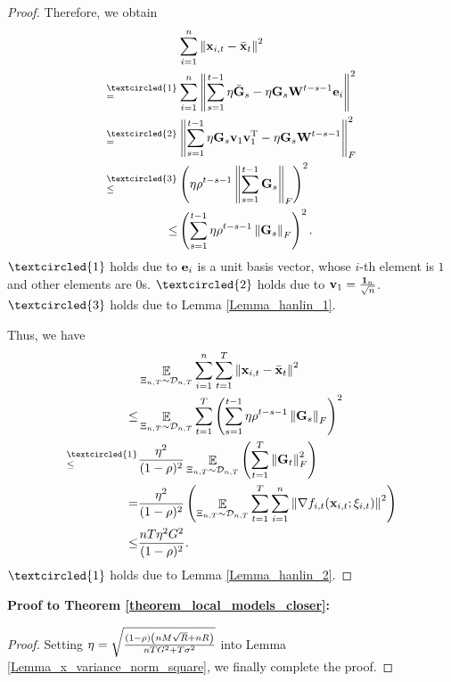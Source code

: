 \documentclass{article}
\begin{document}
\begin{proof}
Therefore, we obtain
\begin{align}
\nonumber
& \sum_{i=1}^n \lrnorm{\x_{i,t} - \bar{\x}_t}^2 \\ \nonumber
\refabovecir{=}{\textcircled{1}} & \sum_{i=1}^n \lrnorm{ \sum_{s=1}^{t-1} \eta \bar{\G}_s - \eta \G_s \W^{t-s-1}\e_i }^2   \\ \nonumber
\refabovecir{=}{\textcircled{2}} & \lrnorm{ \sum_{s=1}^{t-1} \eta \G_s\v_1 \v_1\Tr - \eta \G_s \W^{t-s-1} }^2_F   \\ \nonumber
\refabovecir{\le}{\textcircled{3}} & \lrincir{ \eta \rho^{t-s-1} \lrnorm{\sum_{s=1}^{t-1}\G_s}_F}^2 \\ \nonumber
\le & \lrincir{ \sum_{s=1}^{t-1} \eta \rho^{t-s-1} \lrnorm{\G_s}_F}^2.
\end{align} $\textcircled{1}$ holds due to ${\bf e}_i$ is a unit basis vector, whose $i$-th element is $1$ and other elements are $0$s. $\textcircled{2}$ holds due to ${\bf v}_1 = \frac{{\bf 1}_n}{\sqrt{n}}$. $\textcircled{3}$ holds due to Lemma \ref{Lemma_hanlin_1}. 


Thus, we  have
\begin{align}
\nonumber
& \EE_{ \Xi_{n,T} \sim \Dcal_{n,T} } \sum_{i=1}^n\sum_{t=1}^T \lrnorm{\x_{i,t} - \bar{\x}_t}^2  \\ \nonumber 
\le & \EE_{ \Xi_{n,T} \sim \Dcal_{n,T} } \sum_{t=1}^T \lrincir{ \sum_{s=1}^{t-1} \eta \rho^{t-s-1} \lrnorm{\G_s}_F}^2  \\ \nonumber
\refabovecir{\le}{\textcircled{1}} & \frac{\eta^2}{(1-\rho)^2} \EE_{ \Xi_{n,T} \sim \Dcal_{n,T} } \lrincir{  \sum_{t=1}^T \lrnorm{\G_t}_F^2 } \\ \nonumber
= & \frac{\eta^2}{(1-\rho)^2} \lrincir{ \EE_{ \Xi_{n,T} \sim \Dcal_{n,T} } \sum_{t=1}^T \sum_{i=1}^n  \lrnorm{\nabla f_{i,t}(\x_{i,t};\xi_{i,t})}^2 } \\ \nonumber
\le & \frac{nT\eta^2 G^2 }{(1-\rho)^2}.
\end{align} $\textcircled{1}$ holds due to Lemma \ref{Lemma_hanlin_2}. 
\end{proof}

\textbf{Proof to Theorem \ref{theorem_local_models_closer}:}
\begin{proof}
Setting $\eta = \sqrt{\frac{(1-\rho) \left( nM\sqrt{R} + nR \right)}{ nTG^2 + T\sigma^2 }}$ into Lemma \ref{Lemma_x_variance_norm_square}, we finally complete the proof.
\end{proof}
\end{document}
